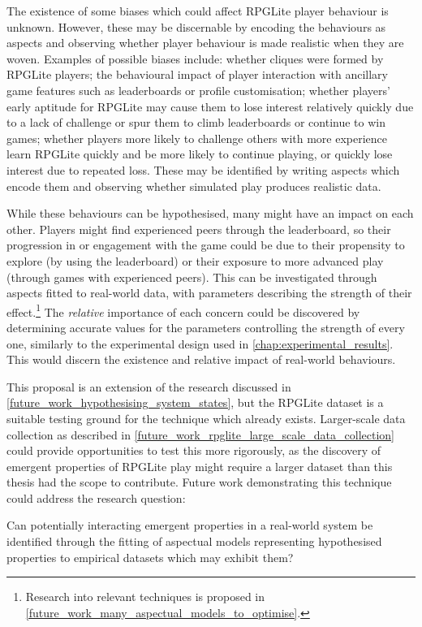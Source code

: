 The existence of some biases which could affect RPGLite player behaviour is
unknown. However, these may be discernable by encoding the behaviours as aspects
and observing whether player behaviour is made realistic when they are woven.
Examples of possible biases include: whether cliques were formed by RPGLite
players; the behavioural impact of player interaction with ancillary game
features such as leaderboards or profile customisation; whether players' early
aptitude for RPGLite may cause them to lose interest relatively quickly due to a
lack of challenge or spur them to climb leaderboards or continue to win games;
whether players more likely to challenge others with more experience learn
RPGLite quickly and be more likely to continue playing, or quickly lose interest
due to repeated loss. These may be identified by writing aspects which encode
them and observing whether simulated play produces realistic data.

While these behaviours can be hypothesised, many might have an impact on each
other. Players might find experienced peers through the leaderboard, so their
progression in or engagement with the game could be due to their propensity to
explore (by using the leaderboard) or their exposure to more advanced play
(through games with experienced peers). This can be investigated through aspects
fitted to real-world data, with parameters describing the strength of their
effect.\footnote{Research into relevant techniques is proposed in
\cref{future_work_many_aspectual_models_to_optimise}.} The \emph{relative}
importance of each concern could be discovered by determining accurate values
for the parameters controlling the strength of every one, similarly to the
experimental design used in \cref{chap:experimental_results}. This would discern
the existence and relative impact of real-world behaviours.

This proposal is an extension of the research discussed in
\cref{future_work_hypothesising_system_states}, but the RPGLite dataset is a
suitable testing ground for the technique which already exists. Larger-scale
data collection as described in
\cref{future_work_rpglite_large_scale_data_collection} could provide
opportunities to test this more rigorously, as the discovery of emergent
properties of RPGLite play might require a larger dataset than this thesis had
the scope to contribute. Future work demonstrating this technique could address
the research question:

\begin{researchquestion}
    Can potentially interacting emergent properties in a real-world system be
    identified through the fitting of aspectual models representing hypothesised
    properties to empirical datasets which may exhibit them?
\end{researchquestion}


